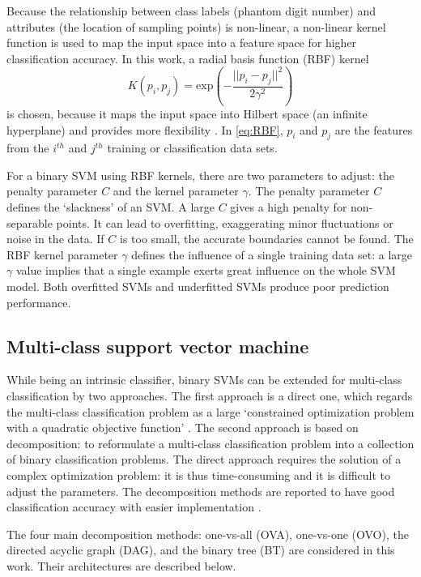 Because the relationship between class labels (phantom digit number) and attributes (the location of sampling points) is non-linear, a non-linear kernel function is used to map the input space into a feature space for higher classification accuracy. 
In this work, a radial basis function (RBF) kernel 
\begin{equation}
\label{eq:RBF}
K(p_i,p_j) = \text{exp}(- \frac{ ||p_i-p_j|| ^2}   {2 \gamma^2})
\end{equation}
is chosen, because it maps the input space into Hilbert space (an infinite hyperplane) and provides more flexibility \cite{amari1999improving}. In \eqref{eq:RBF}, $p_i$ and $p_j$ are the features from the $i^{th}$ and $j^{th}$ training or classification data sets.

For a binary SVM using RBF kernels, there are two parameters to adjust: the penalty parameter $C$ and the kernel parameter $\gamma$. 
The penalty parameter $C$ defines the  `slackness'  of an SVM. A large $C$ gives a high penalty for non-separable points. It can lead to overfitting, exaggerating minor fluctuations or noise in the data. 
If $C$ is too small, the accurate boundaries cannot be found.
The RBF kernel parameter $\gamma$ defines the influence of a single training data set: a large $\gamma$ value implies that a single example exerts great influence on the whole SVM model.  Both overfitted SVMs and underfitted SVMs produce poor prediction performance. 


\subsection{Multi-class support vector machine}
While being an intrinsic classifier, binary SVMs can be extended for multi-class classification by two approaches.  
The first approach is a direct one, which regards the multi-class classification problem as a large `constrained optimization problem with a quadratic objective function' \cite{crammer2002algorithmic}. The second approach is based on decomposition: to reformulate a multi-class classification problem into a collection of binary classification problems.  The direct approach requires the solution of a complex optimization problem: it is thus time-consuming and it is difficult to adjust the parameters. The decomposition methods are reported to have good classification accuracy with easier implementation \cite{sabzekar2009improved}.

The four main decomposition methods: one-vs-all (OVA), one-vs-one (OVO), the directed acyclic graph (DAG), and the binary tree (BT)  are considered in this work. Their architectures are described below.

